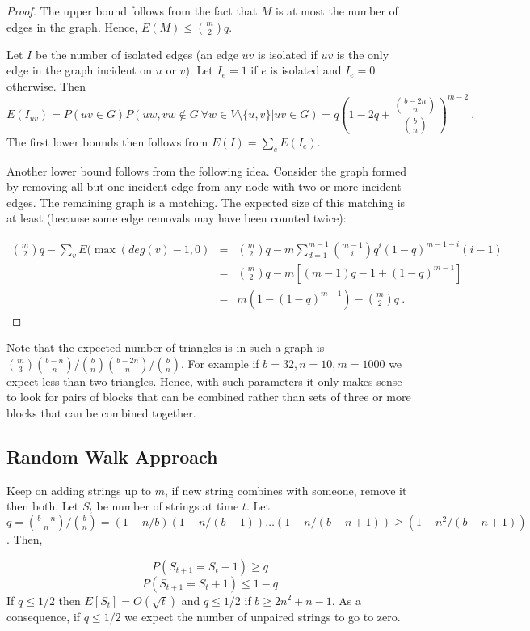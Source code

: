 \documentclass[11pt]{article}
\newcommand{\rounddown}[1]{\left \lfloor  #1 \right \rfloor}
\begin{document}
\begin{proof}
The upper bound follows from the fact that $M$ is at most the number of edges in the graph. Hence, $E(M)\leq {m \choose 2} q$.

Let $I$ be the number of isolated edges (an edge $uv$ is isolated if $uv$ is the only edge in the graph incident on $u$ or $v$). Let $I_e=1$ if $e$ is isolated and  $I_e=0$ otherwise. Then 
\[
E(I_{uv})=P(uv\in G)P(uw, vw \not \in G ~ \forall w\in V\setminus \{u,v\}| uv\in G)
=q\left (1-2q+\frac{{b-2n \choose n}}{{b \choose n}}\right )^{m-2} \ .
\]
The first lower bounds then follows from $E(I)=\sum_e E(I_e)$.

Another lower bound follows from the following idea. Consider the graph formed by removing all but one incident edge from any node with two or more incident edges. The remaining graph is a matching. The expected size of this matching is at least (because some edge removals may have been counted twice):

\begin{eqnarray*}
{m \choose 2} q-\sum_v E(\max(deg(v)-1,0)
&=&
{m \choose 2} q
-m\sum_{d=1}^{m-1} {m-1\choose i} q^i (1-q)^{m-1-i}(i-1)\\
&=& {m \choose 2} q-m[(m-1)q-1+(1-q)^{m-1}]\\
&=& m(1-(1-q)^{m-1})-{m \choose 2} q \ .
\end{eqnarray*}
\end{proof}

Note that the expected number of triangles is in such a graph is ${m \choose 3} {b-n \choose n}/{b\choose n} {b-2n \choose n}/{b\choose n}$. For example if $b=32, n=10, m=1000$ we expect less than two triangles. Hence, with such parameters it only makes sense to look for pairs of blocks that can be combined rather than sets of three or more blocks that can be combined together.

\subsection{Random Walk Approach}

Keep on adding strings up to $m$, if new string combines with someone, remove it then both. Let $S_t$ be number of strings at time $t$. Let $q={b-n \choose n}/{b\choose n}=(1-n/b)(1-n/(b-1))\ldots (1-n/(b-n+1))\geq (1-n^2/(b-n+1))$. Then,

\[P(S_{t+1}=S_t-1)\geq q\]
\[P(S_{t+1}=S_t+1)\leq 1-q\]
If $q\leq 1/2$ then $E[S_t]=O(\sqrt{t})$ and $q\leq 1/2$ if $b\geq 2n^2+n-1$. As a consequence, if $q\leq 1/2$ we expect the number of unpaired strings to go to zero.
\end{document}
